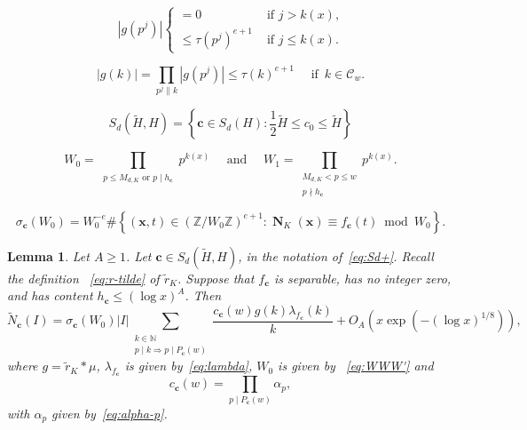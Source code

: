 \documentclass[10pt,a4paper]{amsart}
\newtheorem{lemma}{Lemma}
\newcommand\NN{\mathbb{N}}
\newcommand\ZZ{\mathbb{Z}}
\renewcommand{\c}{\mathbf{c}}
\renewcommand{\geq}{\geqslant}
\renewcommand{\leq}{\leqslant}
\DeclareMathOperator{\nf}{\mathbf{N}}
\newcommand{\x}{\mathbf{x}}
\begin{document}
\begin{equation}\label{eq:nature-g}
|g(p^j)|
\begin{cases}
=0 &\text{ if $j>k(x)$,}\\
\leq  \tau(p^j)^{e+1} &\text{ if $j\leq k(x)$.}
\end{cases}
\end{equation}

\begin{equation}\label{eq:size-g}
|g(k)|=\prod_{p^j\| k} |g(p^j)| \leq 
 \tau(k)^{e+1} \quad \text{ if }\, k\in \mathcal{C}_w.
\end{equation}

\begin{equation}\label{eq:Sd+}
S_d(\tilde H, H)=
\left\{\c\in S_d(H): \frac{1}{2}\tilde H\leq c_0\leq \tilde H \right\}
\end{equation}

\begin{equation}\label{eq:WWW'}
W_0=\prod_{\substack{\text{$p\leq M_{d,K}$ or $p\mid h_\c$}}} p^{k(x)} \quad \text{ and } \quad 
W_1=\prod_{\substack{M_{d,K}<p\leq w \\ p\nmid h_\c}}p^{k(x)} .
\end{equation}

\begin{equation}\label{eq:sig-c}
\sigma_\c(W_0)=W_0^{-e}\#\left\{
(\x,t)\in (\ZZ/W_0\ZZ)^{e+1}: \nf_K(\x)\equiv f_\c(t)\bmod{W_0}
\right\}.
\end{equation}

\begin{lemma}\label{lem:tilde-N}
Let $A\geq 1$.
Let $\c\in S_d(\tilde H, H)$, in the notation of~\eqref{eq:Sd+}. 
Recall the definition ~\eqref{eq:r-tilde} of 
$\tilde r_K$.
Suppose that $f_\c$ is separable, has no integer zero, and has content $h_\c\leq (\log x)^A$.
Then
$$
\tilde N_\c(I) = 
\sigma_\c(W_0)|I| 
\sum_{\substack{k\in \NN\\ p\mid k \Rightarrow p\mid P_\c(w) }}
\frac{c_\c(w) g(k) 	
\lambda_{f_\c}(k)}{k}
+O_A\left(
x\exp\left(-(\log x)^{1/8}\right)\right),
$$
where $g=\tilde r_K*\mu$, $\lambda_{f_\c}$ is given by~\eqref{eq:lambda}, 
 $W_0$ is given by ~\eqref{eq:WWW'} and 
$$
c_\c(w)=\prod_{p\mid P_\c(w)} \alpha_p,
$$
with  $\alpha_p$  given by~\eqref{eq:alpha-p}.
\end{lemma}
\end{document}
